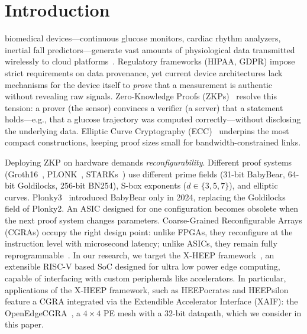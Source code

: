 \section{Introduction}
\label{sec:introduction}

 biomedical devices---continuous glucose monitors, cardiac rhythm analyzers, inertial fall predictors---generate vast amounts of physiological data transmitted wirelessly to cloud platforms~\cite{wearable-health}. Regulatory frameworks (HIPAA, GDPR) impose strict requirements on data provenance, yet current device architectures lack mechanisms for the device itself to \emph{prove} that a measurement is authentic without revealing raw signals. Zero-Knowledge Proofs (ZKPs)~\cite{groth16,plonk} resolve this tension: a prover (the sensor) convinces a verifier (a server) that a statement holds---e.g., that a glucose trajectory was computed correctly---without disclosing the underlying data. Elliptic Curve Cryptography (ECC)~\cite{ecc-iot} underpins the most compact constructions, keeping proof sizes small for bandwidth-constrained links.

Deploying ZKP on hardware demands \emph{reconfigurability}. Different proof systems (Groth16~\cite{groth16}, PLONK~\cite{plonk}, STARKs~\cite{stark-anatomy}) use different prime fields (31-bit BabyBear, 64-bit Goldilocks, 256-bit BN254), S-box exponents ($d\!\in\!\{3,5,7\}$), and elliptic curves. Plonky3~\cite{babybear} introduced BabyBear only in 2024, replacing the Goldilocks field of Plonky2. An ASIC designed for one configuration becomes obsolete when the next proof system changes parameters. Coarse-Grained Reconfigurable Arrays (CGRAs) occupy the right design point: unlike FPGAs, they reconfigure at the instruction level with microsecond latency; unlike ASICs, they remain fully reprogrammable~\cite{cgra-survey}. In our research, we target the X-HEEP framework~\cite{xheep}, an extensible
RISC-V based SoC designed for ultra low power edge computing, capable of interfacing with custom peripherals like accelerators. In particular, applications of the X-HEEP framework, such as  HEEPocrates and HEEPsilon feature a CGRA integrated via the Extendible Accelerator Interface (XAIF): the OpenEdgeCGRA~\cite{openedge-cgra},
a $4 \times 4$ PE mesh with a 32-bit datapath,
which we consider in this paper.

